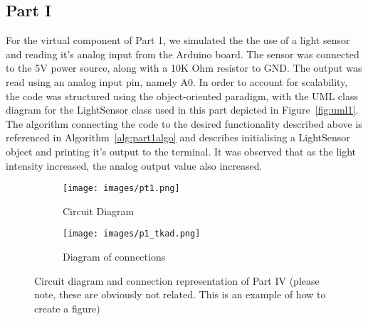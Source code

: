 \documentclass[journal]{IEEEtran}
\begin{document}
\subsection{Part I}
For the virtual component of Part 1, we simulated the the use of a light sensor and reading it's analog input from the Arduino board. The sensor was connected to the 5V power source, along with a 10K Ohm resistor to GND. The output was read using an analog input pin, namely A0. In order to account for scalability, the code was structured using the object-oriented paradigm, with the UML class diagram for the LightSensor class used in this part depicted in Figure~\ref{fig:uml1}. 
The algorithm connecting the code to the desired functionality described above is referenced in Algorithm~\ref{alg:part1algo} and describes initialising a LightSensor object and printing it's output to the terminal. It was observed that as the light intensity increased, the analog output value also increased.
\begin{figure}[ht]
    \centering
      \begin{subfigure}[b]{0.2\textwidth}
         \centering
         \texttt{[image: images/pt1.png]} 
         \caption{Circuit Diagram}
         \label{fig:Circuit_diagram1}
     \end{subfigure}
     \begin{subfigure}[b]{0.2\textwidth}
         \centering
         \texttt{[image: images/p1\_tkad.png]} 
         \caption{Diagram of connections}
         \label{fig:connections1}
     \end{subfigure}  \hfill
    \caption{Circuit diagram and connection representation of Part IV (please note, these are obviously not related. This is an example of how to create a figure)}
    \label{fig:part1}
\end{figure}

\end{document}
